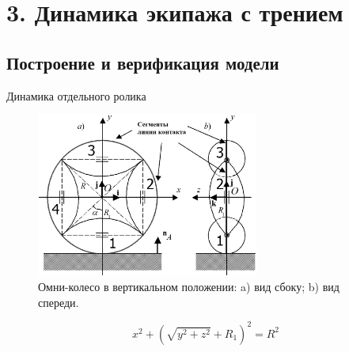 \section{3. Динамика экипажа с трением}

\subsection{Построение и верификация модели}

\begin{frame}{Динамика отдельного ролика}
    \begin{figure}[htb]
        \centering\includegraphics[width=0.65\textwidth]{content/parts/3_friction/nd/OmniWheel.eps}
        \caption{Омни-колесо в вертикальном положении: a) вид сбоку; b) вид спереди.}
    \end{figure}
    $$ x^2+\left(\sqrt{y^2+z^2}+R_1\right)^2=R^2 $$
\end{frame}

